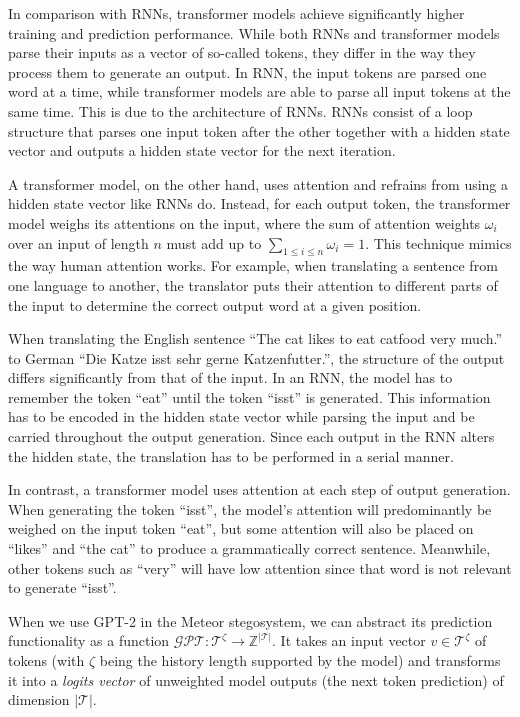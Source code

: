 In comparison with RNNs, transformer models achieve significantly higher training and prediction performance.
While both RNNs and transformer models parse their inputs as a vector of so-called tokens, they differ in the way they process them to generate an output.
In RNN, the input tokens are parsed one word at a time, while transformer models are able to parse all input tokens at the same time.
This is due to the architecture of RNNs.
RNNs consist of a loop structure that parses one input token after the other together with a hidden state vector and outputs a hidden state vector for the next iteration.

A transformer model, on the other hand, uses attention and refrains from using a hidden state vector like RNNs do.
Instead, for each output token, the transformer model weighs its attentions on the input, where the sum of attention weights $\omega_i$ over an input of length $n$ must add up to $\sum_{1\leq i \leq n} \omega_i = 1$.
This technique mimics the way human attention works.
For example, when translating a sentence from one language to another, the translator puts their attention to different parts of the input to determine the correct output word at a given position.

\begin{example}
  When translating the English sentence ``The cat likes to eat catfood very much.'' to German ``Die Katze isst sehr gerne Katzenfutter.'', the structure of the output differs significantly from that of the input.
  In an RNN, the model has to remember the token ``eat'' until the token ``isst'' is generated.
  This information has to be encoded in the hidden state vector while parsing the input and be carried throughout the output generation.
  Since each output in the RNN alters the hidden state, the translation has to be performed in a serial manner.
    
  In contrast, a transformer model uses attention at each step of output generation.
  When generating the token ``isst'', the model's attention will predominantly be weighed on the input token ``eat'', but some attention will also be placed on ``likes'' and ``the cat'' to produce a grammatically correct sentence.
  Meanwhile, other tokens such as ``very'' will have low attention since that word is not relevant to generate ``isst''.
\end{example}



When we use GPT-2 in the Meteor stegosystem, we can abstract its prediction functionality as a function $\mathcal{GPT} \colon \mathcal{T}^\zeta \rightarrow \mathbb{Z}^{|\mathcal{T}|}$.
It takes an input vector $v \in \mathcal{T}^\zeta$ of tokens (with $\zeta$ being the history length supported by the model) and transforms it into a \emph{logits vector} of unweighted model outputs (the next token prediction) of dimension $|\mathcal{T}|$.


